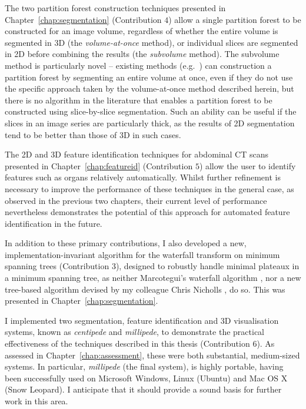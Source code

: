 The two partition forest construction techniques presented in Chapter~\ref{chap:segmentation} (Contribution $4$) allow a single partition forest to be constructed for an image volume, regardless of whether the entire volume is segmented in 3D (the \emph{volume-at-once} method), or individual slices are segmented in 2D before combining the results (the \emph{subvolume} method). The subvolume method is particularly novel -- existing methods (e.g.~\cite{yu02,marfil07}) can construction a partition forest by segmenting an entire volume at once, even if they do not use the specific approach taken by the volume-at-once method described herein, but there is no algorithm in the literature that enables a partition forest to be constructed using slice-by-slice segmentation. Such an ability can be useful if the slices in an image series are particularly thick, as the results of 2D segmentation tend to be better than those of 3D in such cases.

The 2D and 3D feature identification techniques for abdominal CT scans presented in Chapter~\ref{chap:featureid} (Contribution $5$) allow the user to identify features such as organs relatively automatically. Whilst further refinement is necessary to improve the performance of these techniques in the general case, as observed in the previous two chapters, their current level of performance nevertheless demonstrates the potential of this approach for automated feature identification in the future.

In addition to these primary contributions, I also developed a new, implementation-invariant algorithm for the waterfall transform on minimum spanning trees (Contribution $3$), designed to robustly handle minimal plateaux in a minimum spanning tree, as neither Marcotegui's waterfall algorithm \cite{marcotegui05}, nor a new tree-based algorithm devised by my colleague Chris Nicholls \cite{nicholls09}, do so. This was presented in Chapter~\ref{chap:segmentation}.

I implemented two segmentation, feature identification and 3D visualisation systems, known as \emph{centipede} and \emph{millipede}, to demonstrate the practical effectiveness of the techniques described in this thesis (Contribution $6$). As assessed in Chapter~\ref{chap:assessment}, these were both substantial, medium-sized systems. In particular, \emph{millipede} (the final system), is highly portable, having been successfully used on Microsoft Windows, Linux (Ubuntu) and Mac OS X (Snow Leopard). I anticipate that it should provide a sound basis for further work in this area.

